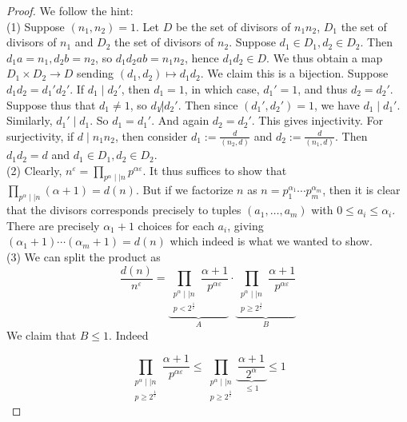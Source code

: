 \documentclass[reqno]{amsart}
\theoremstyle{definition}
\theoremstyle{remark}
\begin{document}
\begin{proof}
    We follow the hint:\\
    (1) Suppose $\left( n_1,n_2 \right) =1$. 
    Let $D$ be the set of divisors of $n_1n_2$, 
    $D_1 $ the set of divisors of $n_1$ and
    $D_2$ the set of divisors of $n_2$.
    Suppose $d_1 \in D_1, d_2 \in D_2$.
    Then $d_1 a = n_1, d_2 b = n_2$, so
    $d_1d_2 ab = n_1n_2$, hence
    $d_1d_2 \in D$. We thus obtain a map
    $D_1 \times D_2 \to D$ sending
    $\left( d_1,d_2 \right) \mapsto d_1d_2$. We claim this is
    a bijection. Suppose
    $d_1d_2 = d_1' d_2'$.
    If $d_1  \mid d_2'$, then
    $d_1 = 1$, in which case,
    $d_1' = 1$, and thus $d_2 = d_2'$.
    Suppose thus that $d_1 \neq 1$, so
    $d_1 \not| d_2'$.
    Then since $\left( d_1', d_2' \right) =1$, we have
    $d_1  \mid d_1'$. Similarly,
    $d_1'  \mid d_1$. So 
    $d_1 = d_1'$. And again $d_2 = d_2'$. This gives injectivity.
    For surjectivity, if
    $d  \mid n_1n_2$, then consider
    $d_1 := \frac{d}{\left( n_2,d \right) }$ and
    $d_2 := \frac{d}{\left( n_1,d \right) }$.
    Then $d_1 d_2 = d$ and $d_1 \in D_1, d_2 \in D_2$.\\
    (2) Clearly,
    $n^{\varepsilon} = \prod_{p^{\alpha} \mid  \mid 
    n} p^{\alpha \varepsilon}$. It thus suffices to show that
    $\prod_{p^{\alpha} \mid  \mid n} \left( \alpha+1 \right) 
    = d(n)$. But if we factorize $n$ as
    $n = p_1^{\alpha_1} \cdots p_m^{\alpha_m}$, then
    it is clear that the divisors corresponds precisely to
    tuples
    $\left( a_1, \ldots, a_m \right) $ with
    $0 \le a_i \le \alpha_i$. There
    are precisely $\alpha_1 + 1$ choices for each
    $a_i$, giving
    $\left( \alpha_1 +1 \right) \cdots
    \left( \alpha_m +1 \right) = d(n)$ which indeed
    is what we wanted to show.\\
    (3) We can split the product as
    \[
    \frac{d(n)}{n^{\varepsilon}} = 
    \underbrace{\prod_{\substack{p^{\alpha} \mid  \mid n \\ p <
    2^{\frac{1}{\varepsilon}}}}
\frac{\alpha+1}{p^{\alpha \varepsilon}}}_{A}
    \cdot 
    \underbrace{\prod_{\substack{p^{\alpha} \mid  \mid n \\ p \ge 
    2^{\frac{1}{\varepsilon}}}}
\frac{\alpha+1}{p^{\alpha \varepsilon}}}_{B}
    \] 
    We claim that $B \le 1$. Indeed

    \[
    \prod_{\substack{p^{\alpha} \mid  \mid n \\ p \ge 
    2^{\frac{1}{\varepsilon}}}}
    \frac{\alpha+1}{p^{\alpha \varepsilon}}
    \le 
    \prod_{\substack{p^{\alpha} \mid  \mid n \\ p \ge 
    2^{\frac{1}{\varepsilon}}}}
    \underbrace{\frac{\alpha+1}{2^{\alpha}}}_{\le 1}
    \le 1
    \] 


\end{proof}
\end{document}
